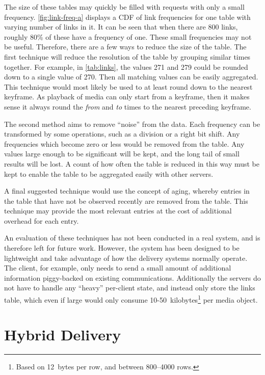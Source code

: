 The size of these tables may quickly be filled with requests with only a small frequency. \autoref{fig:link-freq-a} displays a CDF of link frequencies for one table with varying number of links in it. It can be seen that when there are 800 links, roughly 80\% of these have a frequency of one. These small frequencies may not be useful. Therefore, there are a few ways to reduce the size of the table. The first technique will reduce the resolution of the table by grouping similar times together. For example, in \autoref{tab:links}, the values 271 and 279 could be rounded down to a single value of 270. Then all matching values can be easily aggregated. This technique would most likely be used to at least round down to the nearest keyframe. As playback of media can only start from a keyframe, then it makes sense it always round the \emph{from} and \emph{to} times to the nearest preceding keyframe.

The second method aims to remove ``noise'' from the data. Each frequency can be transformed by some operations, such as a division or a right bit shift. Any frequencies which become zero or less would be removed from the table. Any values large enough to be significant will be kept, and the long tail of small results will be lost. A count of how often the table is reduced in this way must be kept to enable the table to be aggregated easily with other servers.

A final suggested technique would use the concept of aging, whereby entries in the table that have not be observed recently are removed from the table. This technique may provide the most relevant entries at the cost of additional overhead for each entry.

An evaluation of these techniques has not been conducted in a real system, and is therefore left for future work. However, the system has been designed to be lightweight and take advantage of how the delivery systems normally operate. The client, for example, only needs to send a small amount of additional information piggy-backed on existing communications. Additionally the servers do not have to handle any ``heavy'' per-client state, and instead only store the links table, which even if large would only consume 10-50~kilobytes\footnote{Based on 12~bytes per row, and between 800--4000 rows.} per media object.


\section{Hybrid Delivery}

